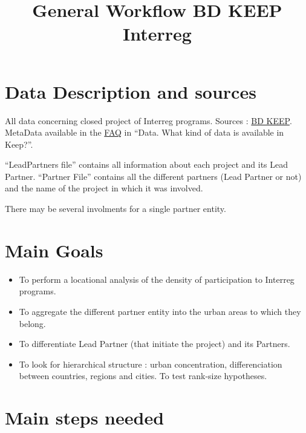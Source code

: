 \documentclass[]{article}
\title{General Workflow BD KEEP Interreg}
\author{}
\date{}
\begin{document}
\maketitle

\hypertarget{data-description-and-sources}{%
\section{Data Description and
sources}\label{data-description-and-sources}}

All data concerning closed project of Interreg programs. Sources :
\href{https://www.keep.eu/}{BD KEEP}. MetaData available in the
\href{https://www.keep.eu/faqs\#}{FAQ} in ``Data. What kind of data is
available in Keep?''.

``LeadPartners file'' contains all information about each project and
its Lead Partner. ``Partner File'' contains all the different partners
(Lead Partner or not) and the name of the project in which it was
involved.

There may be several involments for a single partner entity.

\hypertarget{main-goals}{%
\section{Main Goals}\label{main-goals}}

\begin{itemize}
\item
  To perform a locational analysis of the density of participation to
  Interreg programs.
\item
  To aggregate the different partner entity into the urban areas to
  which they belong.
\item
  To differentiate Lead Partner (that initiate the project) and its
  Partners.
\item
  To look for hierarchical structure : urban concentration,
  differenciation between countries, regions and cities. To test
  rank-size hypotheses.
\end{itemize}

\hypertarget{main-steps-needed}{%
\section{Main steps needed}\label{main-steps-needed}}
\end{document}
